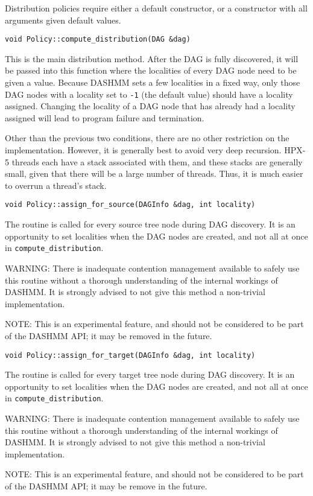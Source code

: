 Distribution policies require either a default constructor, or a constructor
with all arguments given default values.

\begin{lstlisting}
void Policy::compute_distribution(DAG &dag)
\end{lstlisting}

This is the main distribution method. After the DAG is fully discovered, it will
be passed into this function where the localities of every DAG node need to be
given a value. Because DASHMM sets a few localities in a fixed way, only those
DAG nodes with a locality set to \texttt{-1} (the default value) should have
a locality assigned. Changing the locality of a DAG node that has already had
a locality assigned will lead to program failure and termination.

Other than the previous two conditions, there are no other restriction on the
implementation. However, it is generally best to avoid very deep recursion.
HPX-5 threads each have a stack associated with them, and these stacks are
generally small, given that there will be a large number of threads. Thus, it
is much easier to overrun a thread's stack.

\begin{lstlisting}
void Policy::assign_for_source(DAGInfo &dag, int locality)
\end{lstlisting}

The routine is called for every source tree node during DAG discovery. It is an
opportunity to set localities when the DAG nodes are created, and not all at
once in \texttt{compute\_distribution}.

WARNING: There is inadequate contention management available to safely use this
routine without a thorough understanding of the internal workings of DASHMM.
It is strongly advised to not give this method a non-trivial implementation.

NOTE: This is an experimental feature, and should not be considered to be part
of the DASHMM API; it may be removed in the future.

\begin{lstlisting}
void Policy::assign_for_target(DAGInfo &dag, int locality)
\end{lstlisting}

The routine is called for every target tree node during DAG discovery. It is an
opportunity to set localities when the DAG nodes are created, and not all at
once in \texttt{compute\_distribution}.

WARNING: There is inadequate contention management available to safely use this
routine without a thorough understanding of the internal workings of DASHMM.
It is strongly advised to not give this method a non-trivial implementation.

NOTE: This is an experimental feature, and should not be considered to be part
of the DASHMM API; it may be remove in the future.
